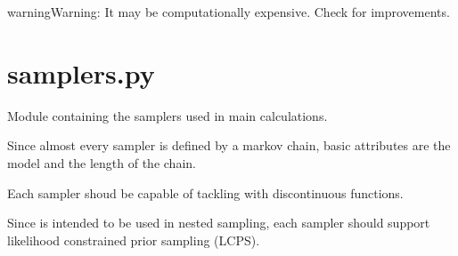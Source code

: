 \documentclass[letterpaper,10pt,english,openany,oneside]{sphinxmanual}
\begin{document}
\begin{fulllineitems}
\begin{sphinxadmonition}{warning}{Warning:}
It may be computationally expensive. Check for improvements.
\end{sphinxadmonition}

\end{fulllineitems}



\section{samplers.py}
\label{\detokenize{autogen:module-samplers}}\label{\detokenize{autogen:samplers-py}}
Module containing the samplers used in main calculations.

Since almost every sampler is defined by a markov chain, basic attributes are
the model and the length of the chain.

Each sampler shoud be capable of tackling with discontinuous functions.

Since is intended to be used in nested sampling, each sampler should support likelihood constrained prior sampling (LCPS).
\end{document}
